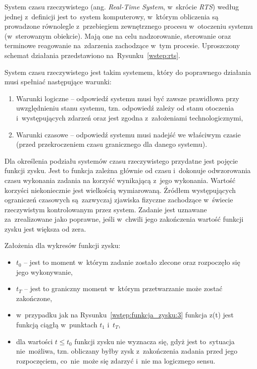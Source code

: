 System czasu rzeczywistego (ang. \textit{Real-Time System}, w~skrócie \textit{RTS}) według jednej z~definicji jest to~system komputerowy, w~którym obliczenia są prowadzone równolegle z~przebiegiem zewnętrznego procesu w~otoczeniu systemu (w~sterowanym obiekcie). Mają one na celu nadzorowanie, sterowanie oraz terminowe reagowanie na~zdarzenia zachodzące w~tym procesie. Uproszczony schemat działania przedstawiono na~Rysunku~\ref{wstep:rts}.

System czasu rzeczywistego jest takim systemem, który do poprawnego działania musi spełniać następujące warunki:
\begin{enumerate}
\item Warunki logiczne -- odpowiedź systemu musi być zawsze prawidłowa przy uwzględnieniu stanu systemu, tzn. odpowiedź zależy od stanu otoczenia i~występujących zdarzeń oraz jest zgodna z~założeniami technologicznymi,
\item Warunki czasowe -- odpowiedź systemu musi nadejść we właściwym czasie (przed przekroczeniem czasu granicznego dla danego systemu).
\end{enumerate}

Dla określenia podziału systemów czasu rzeczywistego przydatne jest pojęcie funkcji zysku. Jest to funkcja zależna głównie od czasu i~dokonuje odwzorowania czasu wykonania zadania na korzyść wynikającą z~jego wykonania. Wartość korzyści niekoniecznie jest wielkością wymiarowaną. Źródłem występujących ograniczeń czasowych są~zazwyczaj zjawiska fizyczne zachodzące w~świecie rzeczywistym kontrolowanym przez system. Zadanie jest uznawane za~zrealizowane jako poprawne, jeśli w~chwili jego zakończenia wartość funkcji zysku jest większa od zera.

Założenia dla wykresów funkcji zysku:
\begin{itemize}
\item $t_0$ -- jest to moment w~którym zadanie zostało zlecone oraz rozpoczęło się jego wykonywanie,
\item $t_T$ -- jest to graniczny moment w~którym przetwarzanie może zostać zakończone,
\item w~przypadku jak na Rysunku~\ref{wstęp:funkcja_zysku:3} funkcja z(t) jest funkcją ciągłą w~punktach $t_1$ i~$t_T$,
\item dla wartości $t \leq t_0$ funkcji zysku nie wyznacza się, gdyż jest to~sytuacja nie~możliwa, tzn. obliczany byłby zysk z~zakończenia zadania przed jego rozpoczęciem, co~nie~może się zdarzyć i~nie ma logicznego sensu.
\end{itemize}


